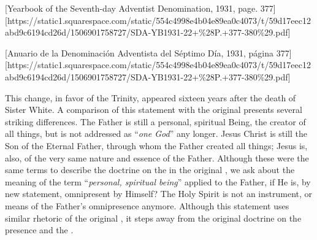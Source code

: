 



[Yearbook of the Seventh-day Adventist Denomination, 1931, page. 377][https://static1.squarespace.com/static/554c4998e4b04e89ea0c4073/t/59d17eec12abd9c6194cd26d/1506901758727/SDA-YB1931-22+\%28P.+377-380\%29.pdf]


[Anuario de la Denominación Adventista del Séptimo Día, 1931, página 377][https://static1.squarespace.com/static/554c4998e4b04e89ea0c4073/t/59d17eec12abd9c6194cd26d/1506901758727/SDA-YB1931-22+\%28P.+377-380\%29.pdf]


This change, in favor of the Trinity, appeared sixteen years after the death of Sister White. A comparison of this statement with the original  presents several striking differences. The Father is still a personal, spiritual Being, the creator of all things, but is not addressed as “\textit{one God}” any longer. Jesus Christ is still the Son of the Eternal Father, through whom the Father created all things; Jesus is, also, of the very same nature and essence of the Father. Although these were the same terms to describe the doctrine on the  in the original , we ask about the meaning of the term “\textit{personal, spiritual being}” applied to the Father, if He is, by new statement, omnipresent by Himself? The Holy Spirit is not an instrument, or means of the Father’s omnipresence anymore. Although this statement uses similar rhetoric of the original , it steps away from the original doctrine on the presence and the .


